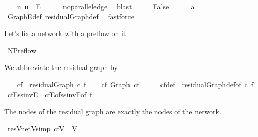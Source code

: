 \begin{isabellebody}
\ \ \isamarkupfalse%
\ {\isachardoublequoteopen}{\isacharparenleft}u{\isacharcomma}\ u{\isacharparenright}\ {\isasymnotin}\ E{\isachardoublequoteclose}\isanewline
\ \ \ \ \isamarkupfalse%
\ no{\isacharunderscore}parallel{\isacharunderscore}edge\ \isamarkupfalse%
\ blast\isanewline
\ \ \isamarkupfalse%
\ \isamarkupfalse%
\ False\isanewline
\ \ \ \ \isamarkupfalse%
\ a{}\ \isamarkupfalse%
\ Graph{\isachardot}E{\isacharunderscore}def\ residualGraph{\isacharunderscore}def\ \isamarkupfalse%
\ fastforce\isanewline
{}\isamarkupfalse%
%
\endisatagproof
{\isafoldproof}%
%
\isadelimproof
\ \isanewline
%
\endisadelimproof
\ \ \isanewline
{}\isamarkupfalse%
%
\begin{isamarkuptext}%
Let's fix a network with a preflow  on it%
\end{isamarkuptext}\isamarkuptrue%
\isamarkupfalse%
\ NPreflow\isanewline
{}%
\begin{isamarkuptext}%
We abbreviate the residual graph by .%
\end{isamarkuptext}\isamarkuptrue%
\ \ \isamarkupfalse%
\ {\isachardoublequoteopen}cf\ {\isasymequiv}\ residualGraph\ c\ f{\isachardoublequoteclose}\isanewline
\ \ \isamarkupfalse%
\ cf{\isacharcolon}\ Graph\ cf%
\isadelimproof
\ %
\endisadelimproof
%
\isatagproof
\isacommand{{\isachardot}}\isamarkupfalse%
%
\endisatagproof
{\isafoldproof}%
%
\isadelimproof
%
\endisadelimproof
\isanewline
\ \ \isamarkupfalse%
\ cf{\isacharunderscore}def\ {\isacharequal}\ residualGraph{\isacharunderscore}def{\isacharbrackleft}of\ c\ f{\isacharbrackright}%
\isamarkuptrue%
\isamarkupfalse%
\ cfE{\isacharunderscore}ss{\isacharunderscore}invE\ {\isacharequal}\ cfE{\isacharunderscore}of{\isacharunderscore}ss{\isacharunderscore}invE{\isacharbrackleft}of\ f{\isacharbrackright}%
\begin{isamarkuptext}%
The nodes of the residual graph are exactly the nodes of the network.%
\end{isamarkuptext}\isamarkuptrue%
\isamarkupfalse%
\ resV{\isacharunderscore}netV{\isacharbrackleft}simp{\isacharbrackright}{\isacharcolon}\ {\isachardoublequoteopen}cf{\isachardot}V\ {\isacharequal}\ V{\isachardoublequoteclose}\isanewline
%
\isadelimproof
%
\endisadelimproof

\end{isabellebody}
